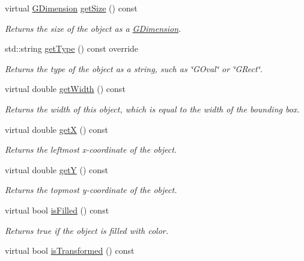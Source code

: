 \begin{DoxyCompactItemize}
virtual \mbox{\hyperlink{structsgl_1_1GDimension}{G\+Dimension}} \mbox{\hyperlink{classsgl_1_1GObject_a7b4eec96a2bdc6420695d5796a78eea9}{get\+Size}} () const
\begin{DoxyCompactList}\small\item\em Returns the size of the object as a {\ttfamily \mbox{\hyperlink{structsgl_1_1GDimension}{G\+Dimension}}}. \end{DoxyCompactList}\item 
std\+::string \mbox{\hyperlink{classsgl_1_1GOval_a9b72ede4ee8520f987a0c01e30654814}{get\+Type}} () const override
\begin{DoxyCompactList}\small\item\em Returns the type of the object as a string, such as {\ttfamily \char`\"{}\+G\+Oval\char`\"{}} or {\ttfamily \char`\"{}\+G\+Rect\char`\"{}}. \end{DoxyCompactList}\item 
virtual double \mbox{\hyperlink{classsgl_1_1GObject_a0ed2965abd4f5701d2cadf71239faf19}{get\+Width}} () const
\begin{DoxyCompactList}\small\item\em Returns the width of this object, which is equal to the width of the bounding box. \end{DoxyCompactList}\item 
virtual double \mbox{\hyperlink{classsgl_1_1GObject_a344385751bee0720059403940d57a13e}{getX}} () const
\begin{DoxyCompactList}\small\item\em Returns the leftmost {\itshape x}-\/coordinate of the object. \end{DoxyCompactList}\item 
virtual double \mbox{\hyperlink{classsgl_1_1GObject_aafa51c7f8f38a09febbb9ce7853f77b4}{getY}} () const
\begin{DoxyCompactList}\small\item\em Returns the topmost {\itshape y}-\/coordinate of the object. \end{DoxyCompactList}\item 
virtual bool \mbox{\hyperlink{classsgl_1_1GObject_a11c404f106940c201b6f326e0355c150}{is\+Filled}} () const
\begin{DoxyCompactList}\small\item\em Returns {\ttfamily true} if the object is filled with color. \end{DoxyCompactList}\item 
virtual bool \mbox{\hyperlink{classsgl_1_1GObject_a9de207581cfa4ca1eaa06da5f29b75fc}{is\+Transformed}} () const

\end{DoxyCompactItemize}
